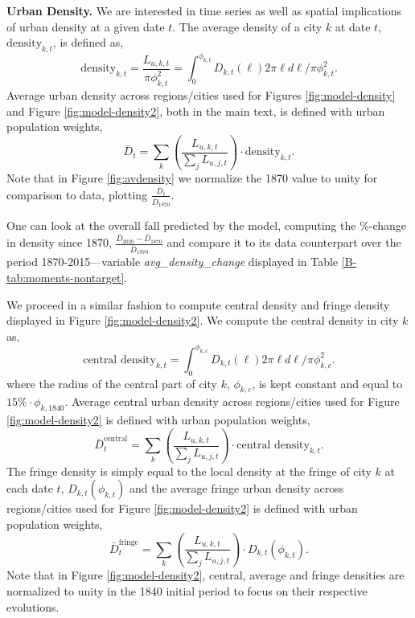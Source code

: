 \documentclass[11pt]{report}
\begin{document}
\textbf{Urban Density.} We are interested in time series as well as spatial implications of urban density at a given date $t$. The average density of a city $k$ at date $t$, $\text{density}_{k,t}$, is defined as,
\begin{equation*}
\text{density}_{k,t} = \frac{L_{u,k,t}}{\pi \phi_{k,t}^2}=\int_0^{\phi_{k,t}} D_{k,t}(\ell) 2 \pi \ell d \ell/\pi \phi_{k,t}^2.
\end{equation*}
Average urban density across regions/cities used for Figures \ref{fig:model-density} and Figure \ref{fig:model-density2}, both in the main text, is defined with urban population weights, 
\begin{equation*}
	\bar{D}_t = \sum_k \left( \frac{L_{u,k,t}}{\sum_j L_{u,j,t}}\right) \cdot\text{density}_{k,t}.
\end{equation*}
Note that in Figure \ref{fig:avdensity} we normalize the 1870 value to unity for comparison to data, plotting $\frac{\bar{D}_t}{\bar{D}_{1870}}$. 

One can look at the overall fall predicted by the model, computing the \%-change in density since 1870, $\frac{\bar{D}_{2020}-\bar{D}_{1870}}{\bar{D}_{1870}}$ and compare it to its data counterpart over the period 1870-2015---variable \emph{avg\_density\_change} displayed in Table \ref{B-tab:moments-nontarget}.

We proceed in a similar fashion to compute central density and fringe density displayed in Figure \ref{fig:model-density2}. We compute the central density in city $k$ as, 
\begin{equation*}
\text{central density}_{k,t} =\int_0^{\phi_{k,c}} D_{k,t}(\ell) 2 \pi \ell d \ell/\pi \phi_{k,c}^2.
\end{equation*}
where the radius of the central part of city $k$,  $\phi_{k,c}$, is kept constant and equal to $15\% \cdot \phi_{k,1840}$. 
Average central urban density across regions/cities used for Figure \ref{fig:model-density2} is defined with urban population weights, 
\begin{equation*}
\bar{D}^{\text{central}}_t = \sum_k \left( \frac{L_{u,k,t}}{\sum_j L_{u,j,t}}\right) \cdot\text{central density}_{k,t}.
\end{equation*}
The fringe density is simply equal to the local density at the fringe of city $k$ at each date $t$, $D_{k,t}(\phi_{k,t})$ and the average fringe urban density across regions/cities used for Figure \ref{fig:model-density2} is defined with urban population weights, 
\begin{equation*}
\bar{D}^{\text{fringe}}_t = \sum_k \left( \frac{L_{u,k,t}}{\sum_j L_{u,j,t}}\right) \cdot D_{k,t}(\phi_{k,t}).
\end{equation*}
Note that in Figure \ref{fig:model-density2}, central, average and fringe densities are normalized to unity in the 1840 initial period to focus on their respective evolutions. 
\end{document}
